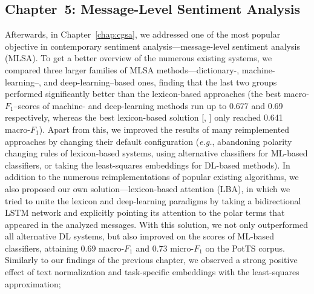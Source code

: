 \documentclass[11pt]{article}
\newcommand{\eg}{\textit{e.g.},}
\newcommand{\F}[0]{$F_1$}
\begin{document}
\subsection{Chapter~5: Message-Level Sentiment Analysis}

Afterwards, in Chapter~\ref{chap:cgsa}, we addressed one of the most
popular objective in contemporary sentiment analysis---message-level
sentiment analysis (MLSA).  To get a better overview of the numerous
existing systems, we compared three larger families of MLSA
methods---dictionary-, machine-learning--, and deep-learning--based
ones, finding that the last two groups performed significantly better
than the lexicon-based approaches (the best macro-\F{}--scores of
machine- and deep-learning methods run up to 0.677 and 0.69
respectively, whereas the best lexicon-based solution
[\citeauthor{Hu:04}, \citeyear{Hu:04}] only reached 0.641 macro-\F{}).
Apart from this, we improved the results of many reimplemented
approaches by changing their default configuration (\eg{} abandoning
polarity changing rules of lexicon-based systems, using alternative
classifiers for ML-based classifiers, or taking the least-squares
embeddings for DL-based methods).  In addition to the numerous
reimplementations of popular existing algorithms, we also proposed our
own solution---lexicon-based attention (LBA), in which we tried to
unite the lexicon and deep-learning paradigms by taking a
bidirectional LSTM network and explicitly pointing its attention to
the polar terms that appeared in the analyzed messages.  With this
solution, we not only outperformed all alternative DL systems, but
also improved on the scores of ML-based classifiers, attaining 0.69
macro-\F{} and 0.73 micro-\F{} on the PotTS corpus.  Similarly to our
findings of the previous chapter, we observed a strong positive effect
of text normalization and task-specific embeddings with the
least-squares approximation;
\end{document}
